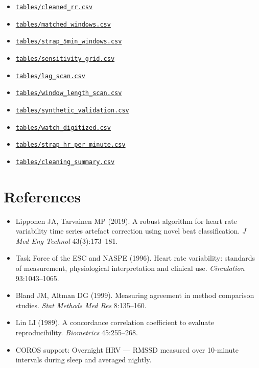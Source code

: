 \documentclass[11pt,a4paper]{article}
\begin{document}
\begin{itemize}
\item \href{tables/cleaned_rr.csv}{\texttt{tables/\allowbreak{}cleaned\_\allowbreak{}rr.\allowbreak{}csv}}
\item \href{tables/matched_windows.csv}{\texttt{tables/\allowbreak{}matched\_\allowbreak{}windows.\allowbreak{}csv}}
\item \href{tables/strap_5min_windows.csv}{\texttt{tables/\allowbreak{}strap\_\allowbreak{}5min\_\allowbreak{}windows.\allowbreak{}csv}}
\item \href{tables/sensitivity_grid.csv}{\texttt{tables/\allowbreak{}sensitivity\_\allowbreak{}grid.\allowbreak{}csv}}
\item \href{tables/lag_scan.csv}{\texttt{tables/\allowbreak{}lag\_\allowbreak{}scan.\allowbreak{}csv}}
\item \href{tables/window_length_scan.csv}{\texttt{tables/\allowbreak{}window\_\allowbreak{}length\_\allowbreak{}scan.\allowbreak{}csv}}
\item \href{tables/synthetic_validation.csv}{\texttt{tables/\allowbreak{}synthetic\_\allowbreak{}validation.\allowbreak{}csv}}
\item \href{tables/watch_digitized.csv}{\texttt{tables/\allowbreak{}watch\_\allowbreak{}digitized.\allowbreak{}csv}}
\item \href{tables/strap_hr_per_minute.csv}{\texttt{tables/\allowbreak{}strap\_\allowbreak{}hr\_\allowbreak{}per\_\allowbreak{}minute.\allowbreak{}csv}}
\item \href{tables/cleaning_summary.csv}{\texttt{tables/\allowbreak{}cleaning\_\allowbreak{}summary.\allowbreak{}csv}}
\end{itemize}
\section*{References}\label{sec:references}
\begin{itemize}
\item Lipponen JA, Tarvainen MP (2019). A robust algorithm for heart rate variability time series artefact correction using novel beat classification. \emph{J Med Eng Technol} 43(3):173–181.
\item Task Force of the ESC and NASPE (1996). Heart rate variability: standards of measurement, physiological interpretation and clinical use. \emph{Circulation} 93:1043–1065.
\item Bland JM, Altman DG (1999). Measuring agreement in method comparison studies. \emph{Stat Methods Med Res} 8:135–160.
\item Lin LI (1989). A concordance correlation coefficient to evaluate reproducibility. \emph{Biometrics} 45:255–268.
\item COROS support: Overnight HRV — RMSSD measured over 10-minute intervals during sleep and averaged nightly.
\end{itemize}
\end{document}
